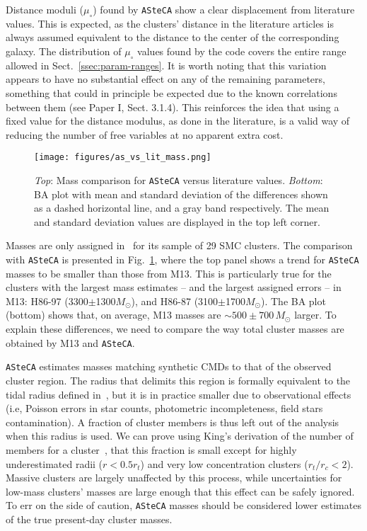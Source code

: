 \documentclass[draft]{aa}
\begin{document}
Distance moduli ($\mu_{\circ}$) found by \texttt{ASteCA} show a clear
displacement from literature values. This is expected, as the clusters' distance
in the literature articles is always assumed equivalent to the
distance to the center of the corresponding galaxy.
The distribution of $\mu_{\circ}$ values found by the code covers the entire
range allowed in Sect.~\ref{ssec:param-ranges}.
%
It is worth noting that this variation appears to have no substantial effect on
any of the remaining parameters, something that could in principle be expected
due to the known correlations between them (see Paper I, Sect. 3.1.4).
This reinforces the idea that using a fixed value for the distance modulus, as
done in the literature, is a valid way of reducing the number of free variables
at no apparent extra cost.\\

\begin{figure}
\centering
\texttt{[image: figures/as\_vs\_lit\_mass.png]}
\caption{\emph{Top}: Mass comparison for \texttt{ASteCA} versus literature
values.
\emph{Bottom}: BA plot with mean and standard deviation of the differences
shown as a dashed horizontal line, and a gray band respectively. The mean and
standard deviation values are displayed in the top left corner.}
\label{fig:as_vs_lit_mass}
\end{figure}

Masses are only assigned in~\citet[][M13]{Maia_2013} for its sample of 29
SMC clusters. The comparison with \texttt{ASteCA} is presented in
Fig.~\ref{fig:as_vs_lit_mass}, where the top panel shows a trend for
\texttt{ASteCA} masses to be smaller than those from M13. This is particularly
true for the clusters with the largest mass estimates -- and the largest
assigned errors -- in M13: H86-97 (3300$\pm$1300$M_{\odot}$), and H86-87
(3100$\pm$1700$M_{\odot}$). The BA plot (bottom) shows that, on average, M13
masses are ${\sim}500{\pm}700\,M_{\odot}$ larger.
%
To explain these differences, we need to compare the way total cluster masses
are obtained by M13 and \texttt{ASteCA}.

\texttt{ASteCA} estimates masses matching synthetic CMDs to that of
the observed cluster region.
The radius that delimits this region is formally equivalent to the
tidal radius defined in~\cite[][see Sect.~\ref{ssec:centre-radius}]{King_1962},
but it is in practice smaller due to observational effects (i.e, Poisson
errors in star counts, photometric incompleteness, field stars contamination).
%
A fraction of cluster members is thus left out of the analysis when this radius
is used. We can prove using King's derivation of the number of
members for a cluster~\citep[Eq. 18,][]{King_1962}, that this fraction is small
except for highly underestimated radii ($r{<}0.5r_t$) and very low concentration
clusters ($r_t/r_c{<}2$).
%
Massive clusters are largely unaffected by this process, while uncertainties for
low-mass clusters' masses are large enough that this effect can be safely
ignored. To err on the side of caution, \texttt{ASteCA} masses should be
considered lower estimates of the true present-day cluster masses.
\end{document}
